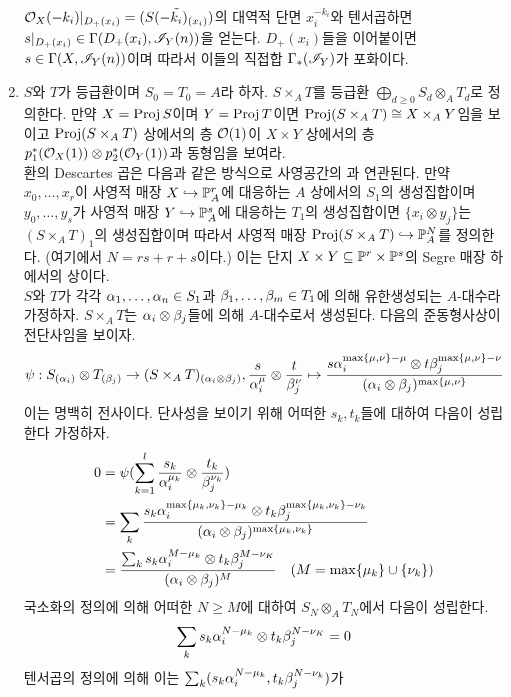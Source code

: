 \begin{enumerate}[label=\tb{5.\arabic*.},itemindent=0mm,itemsep=4mm]
	$\mathcal{O}_X(-k_i)|_{D_+(x_i)}=\tilde{(S(-k_i)_{(x_i)})}$의 대역적 단면 $x_i^{-k_i}$와 텐서곱하면
	$s|_{D_+(x_i)}\in\Gamma(D_+(x_i),\mathscr{I}_Y(n))$을 얻는다.
	$D_+(x_i)$들을 이어붙이면 $s\in\Gamma(X,\mathscr{I}_Y(n))$이며 따라서 이들의 직접합 $\Gamma_*(\mathscr{I}_Y)$가 포화이다.
	\item $S$와 $T$가 등급환이며 $S_0=T_0=A$라 하자.
	 $S\times_AT$를 등급환 $\bigoplus_{d\ge 0}S_d\otimes_AT_d$로 정의한다.
	만약 $X=\operatorname{Proj} S$이며 $Y=\operatorname{Proj} T$이면 $\operatorname{Proj}(S\times_AT)\cong X\times_AY$임을 보이고
	$\operatorname{Proj}(S\times_AT)$ 상에서의 층 $\mathcal{O}(1)$이 $X\times Y$ 상에서의 층
	$p_1^*(\mathcal{O}_X(1))\otimes p_2^*(\mathcal{O}_Y(1))$과 동형임을 보여라.\\
	환의 Descartes 곱은 다음과 같은 방식으로 사영공간의 과 연관된다.
	만약 $x_0,\ldots,x_r$이 사영적 매장 $X\hookrightarrow\mathbb{P}^r_A$에 대응하는 $A$ 상에서의 $S_1$의 생성집합이며
	$y_0,\ldots,y_s$가 사영적 매장 $Y\hookrightarrow\mathbb{P}^s_A$에 대응하는 $T_1$의 생성집합이면
	$\{x_i\otimes y_j\}$는 $(S\times_AT)_1$의 생성집합이며 따라서 사영적 매장 $\operatorname{Proj}(S\times_AT)\hookrightarrow\mathbb{P}^N_A$를 정의한다.
	(여기에서 $N=rs+r+s$이다.) 이는 단지 $X\times Y\subseteq\mathbb{P}^r\times\mathbb{P}^s$의 Segre 매장 하에서의 상이다.\\
	\sol $S$와 $T$가 각각 $\alpha_1,\ldots,\alpha_n\in S_1$과 $\beta_1,\ldots,\beta_m\in T_1$에 의해 유한생성되는 $A$-대수라 가정하자.
	$S\times_AT$는 $\alpha_i\otimes\beta_j$들에 의해 $A$-대수로서 생성된다. 다음의 준동형사상이 전단사임을 보이자.
	$$\psi:S_{(\alpha_i)}\otimes T_{(\beta_j)}\rightarrow(S\times_AT)_{(\alpha_i\otimes\beta_j)},
	\frac{s}{\alpha_i^\mu}\otimes\frac{t}{\beta_j^\nu}\mapsto
	\frac{s\alpha_i^{\max\{\mu,\nu\}-\mu}\otimes t\beta_j^{\max\{\mu,\nu\}-\nu}}{(\alpha_i\otimes\beta_j)^{\max\{\mu,\nu\}}}$$
	이는 명백히 전사이다. 단사성을 보이기 위해 어떠한 $s_k,t_k$들에 대하여 다음이 성립한다 가정하자.
	\begin{align*}
	0&=\psi(\sum_{k=1}^l\frac{s_k}{\alpha_i^{\mu_k}}\otimes\frac{t_k}{\beta_j^{\nu_k}})\\
	&=\sum_k\frac{s_k\alpha_i^{\max\{\mu_k,\nu_k\}-\mu_k}\otimes 
	t_k\beta_j^{\max\{\mu_k,\nu_k\}-\nu_k}}{(\alpha_i\otimes\beta_j)^{\max\{\mu_k,\nu_k\}}}\\
	&=\frac{\sum_ks_k\alpha_i^{M-\mu_k}\otimes 
	t_k\beta_j^{M-\nu_K}}{(\alpha_i\otimes\beta_j)^M}\quad(M=\max\{\mu_k\}\cup\{\nu_k\})
	\end{align*}
	국소화의 정의에 의해 어떠한 $N\ge M$에 대하여 $S_N\otimes_AT_N$에서 다음이 성립한다.
	$$\sum_ks_k\alpha_i^{N-\mu_k}\otimes t_k\beta_j^{N-\nu_K}=0$$
	텐서곱의 정의에 의해 이는 $\sum_k(s_k\alpha_i^{N-\mu_k},t_k\beta_j^{N-\nu_k})$가

\end{enumerate}
